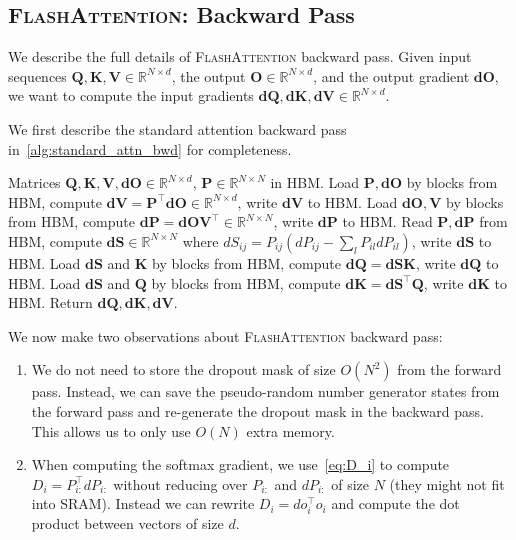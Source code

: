 \documentclass{article}
\newcommand{\vQ}{\mathbf{Q}}
\newcommand{\vK}{\mathbf{K}}
\newcommand{\vV}{\mathbf{V}}
\newcommand{\vdQ}{\mathbf{dQ}}
\newcommand{\vdK}{\mathbf{dK}}
\newcommand{\vdV}{\mathbf{dV}}
\newcommand{\vdS}{\mathbf{dS}}
\newcommand{\vP}{\mathbf{P}}
\newcommand{\vdP}{\mathbf{dP}}
\newcommand{\vO}{\mathbf{O}}
\newcommand{\vdO}{\mathbf{dO}}
\newcommand{\sysname}{\textsc{FlashAttention}\xspace}
\begin{document}
\subsection{\sysname: Backward Pass}
\label{sec:algo_bwd_full}

We describe the full details of \sysname backward pass.
Given input sequences $\vQ, \vK, \vV \in \mathbb{R}^{N \times d}$, the output $\vO \in \mathbb{R}^{N \times d}$,
and the output gradient $\vdO$, we want to
compute the input gradients $\vdQ, \vdK, \vdV \in \mathbb{R}^{N \times d}$.

We first describe the standard attention backward pass in~\cref{alg:standard_attn_bwd} for completeness.
\begin{algorithm}[H]
  \caption{\small\label{alg:standard_attn_bwd}Standard Attention Backward Pass}
  \begin{algorithmic}[1]
    \REQUIRE Matrices $\vQ, \vK, \vV, \vdO \in \mathbb{R}^{N \times d}$, $\vP \in \mathbb{R}^{N \times N}$ in HBM.
    \STATE Load $\vP, \vdO$ by blocks from HBM, compute
    $\vdV = \vP^\top \vdO \in \mathbb{R}^{N \times d}$, write $\vdV$ to HBM.
    \STATE Load $\vdO, \vV$ by blocks from HBM, compute
    $\vdP = \vdO \vV^\top \in \mathbb{R}^{N \times N}$, write $\vdP$ to HBM.
    \STATE Read $\vP, \vdP$ from HBM, compute $\vdS \in \mathbb{R}^{N \times N}$ where
    $dS_{ij} = P_{ij} (dP_{ij} - \sum_l P_{il} dP_{il})$, write $\vdS$ to
    HBM.
    \STATE Load $\vdS$ and $\vK$ by blocks from HBM, compute $\vdQ = \vdS\vK$,
    write $\vdQ$ to HBM.
    \STATE Load $\vdS$ and $\vQ$ by blocks from HBM, compute $\vdK = \vdS^\top\vQ$, write $\vdK$ to
    HBM.
    \STATE Return $\vdQ, \vdK, \vdV$.
  \end{algorithmic}
\end{algorithm}

We now make two observations about \sysname backward pass:
\begin{enumerate}
  \item We do not need to store the dropout mask of size $O(N^2)$ from the
  forward pass.
  Instead, we can save the pseudo-random number generator states from
  the forward pass and re-generate the dropout mask in the backward pass.
  This allows us to only use $O(N)$ extra memory.
  \item When computing the softmax gradient, we use~\cref{eq:D_i} to compute
  $D_i = P_{i:}^\top dP_{i:}$ without reducing over $P_{i:}$ and $dP_{i:}$ of size
  $N$ (they might not fit into SRAM).
  Instead we can rewrite $D_i = do_i^\top o_i$ and compute the dot product between
  vectors of size $d$.
\end{enumerate}
\end{document}

